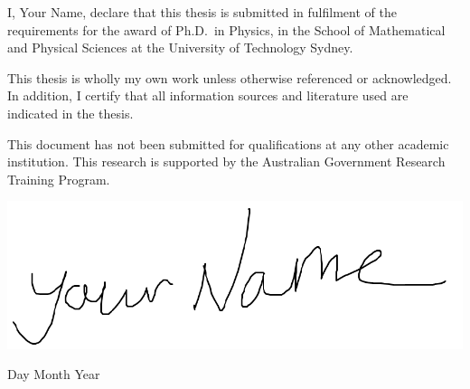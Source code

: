 \begin{originality}
I, Your Name, declare that this thesis is submitted in fulfilment of the requirements for the award of Ph.D.\ in Physics, in the School of Mathematical and Physical Sciences at the University of Technology Sydney. 

This thesis is wholly my own work unless otherwise referenced or acknowledged. In addition, I certify that all information sources and literature used are indicated in the thesis. 

This document has not been submitted for qualifications at any other academic institution. This research is supported by the Australian Government Research Training Program.

\includegraphics[width=0.3\linewidth]{frontmatter/signature.png}

Day Month Year
\end{originality}